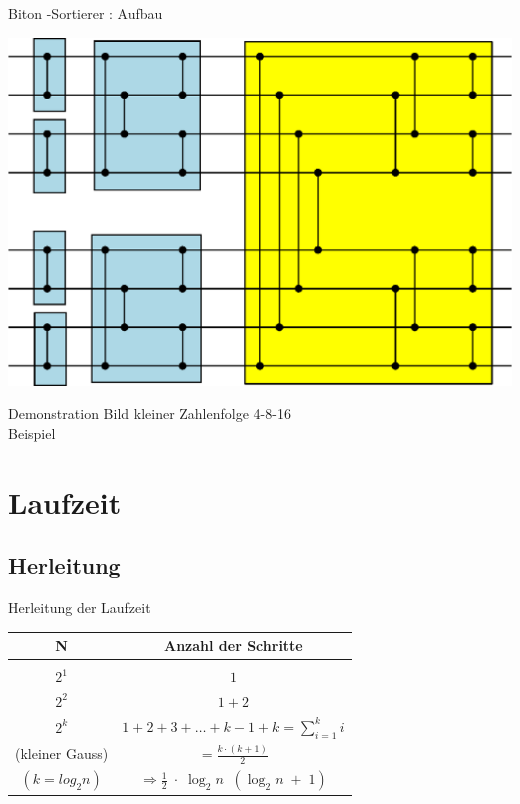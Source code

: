 \documentclass[ucs,9pt]{beamer}
\begin{document}
\begin{frame}{Biton -Sortierer : Aufbau}
    \begin{center}
    		\includegraphics[scale=0.6]{biton2.eps}
    \end{center}
\end{frame}

\begin{frame}{Demonstration}
    Bild kleiner Zahlenfolge 4-8-16\\
    Beispiel
\end{frame}

\section{Laufzeit}
\subsection{Herleitung}

\begin{frame}{Herleitung der Laufzeit}
\begin{center}
\begin{tabular}{c|c}
N & Anzahl der Schritte \\
\hline \\
 {$2^1$} &  { $1$}\\
 {$2^2$} &  { $1 + 2$}\\
 {$2^k$}&  { $1 + 2 + 3 + … + k-1 + k  = \sum_{i=1}^k i$}\\
 {{\color{gray}(kleiner Gauss)}} &  {$ =\frac{k \cdot (k+1)}{2} $} \\
 {{\color{gray}$(k = log_2 n)$}} & {$\Rightarrow \frac{1}{2}\; \cdot\;\log_2 n \;\; (\log_2 n\;+\;1)$} \\
\end{tabular}
\end{center}
\end{frame}
\end{document}
